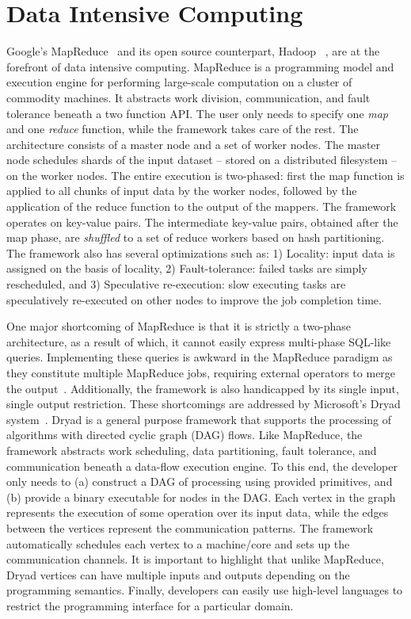 \documentclass[a4paper,12pt,twoside,openright]{report}
\begin{document}
\section{Data Intensive
Computing}\label{chapter:background:section:dataIntensive}
Google's MapReduce~\cite{Dean:2004:MSD} and its open source counterpart, Hadoop
~\cite{hadoop}, are at the forefront of data intensive computing. MapReduce is a
programming model and execution engine for performing large-scale computation on
a cluster of commodity machines. It abstracts work division, communication, and
fault tolerance beneath a two function API. The user only needs to specify one
\emph{map} and one \emph{reduce} function, while the framework takes care of the
rest. The architecture consists of a master node and a set of worker nodes.
The master node schedules shards of the input dataset -- stored on a distributed
filesystem -- on the worker nodes. The entire execution is two-phased: first the
map function is applied to all chunks of input data by the worker nodes,
followed by the application of the reduce function to the output of the mappers.
The framework operates on key-value pairs. The intermediate key-value pairs,
obtained after the map phase, are \emph{shuffled} to a set of reduce workers
based on hash partitioning. The framework also has several optimizations such
as: 1) Locality: input data is assigned on the basis of locality, 2)
Fault-tolerance: failed tasks are simply rescheduled, and 3) Speculative
re-execution: slow executing tasks are speculatively re-executed on other nodes
to improve the job completion time.

One major shortcoming of MapReduce is that it is strictly a two-phase
architecture, as a result of which, it cannot easily express multi-phase
SQL-like queries. Implementing these queries is awkward in the MapReduce
paradigm as they constitute multiple MapReduce jobs, requiring external
operators to merge the output~\cite{Yang:2007:MSR}. Additionally, the framework
is also handicapped by its single input, single output restriction. These
shortcomings are addressed by Microsoft's Dryad system~\cite{Isard:2007:DDD}.
Dryad is a general purpose framework that supports the processing of algorithms
with directed cyclic graph (DAG) flows. Like MapReduce, the framework abstracts
work scheduling, data partitioning, fault tolerance, and communication beneath a
data-flow execution engine. To this end, the developer only needs to (a)
construct a DAG of processing using provided primitives, and (b) provide a
binary executable for nodes in the DAG. Each vertex in the graph represents the
execution of some operation over its input data, while the edges between the
vertices represent the communication patterns. The framework automatically
schedules each vertex to a machine/core and sets up the communication channels.
It is important to highlight that unlike MapReduce, Dryad vertices can have
multiple inputs and outputs depending on the programming semantics. Finally,
developers can easily use high-level languages to restrict the programming
interface for a particular domain.
\end{document}
